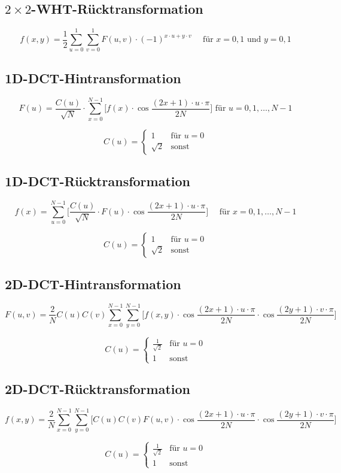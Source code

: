 \subsection*{$2 \times 2$-WHT-Rücktransformation}
\[
    f(x, y) = \frac{1}{2} \sum_{u=0}^{1} \sum_{v=0}^{1} F(u, v) \cdot {(-1)}^{x \cdot u + y \cdot v}
        \quad \mbox{ für } x = 0, 1 \mbox{ und } y = 0, 1
\]

\subsection*{1D-DCT-Hintransformation}
\[
F(u) = \frac{C(u)}{\sqrt{N}}
    \cdot \sum_{x=0}^{N-1} \bigg[ f(x)
    \cdot \cos{\frac{(2x+1) \cdot u \cdot \pi{}}{2N}}
    \bigg] \mbox{  für } u=0,1,\ldots,N-1
\]
    
\[
    C(u) = \begin{cases}
        1 & \text{für } u=0\\
        \sqrt{2} & \text{sonst}
    \end{cases}
\]

\subsection*{1D-DCT-Rücktransformation}
\[
    f(x) = \sum_{u=0}^{N-1} \bigg[ \frac{C(u)}{\sqrt{N}}
    \cdot F(u)
    \cdot \cos{\frac{(2x+1) \cdot u \cdot \pi{}}{2N}}
    \bigg] \quad \mbox{ für } x=0,1,\ldots,N-1
\]
    
\[
    C(u) = \begin{cases}
        1 & \text{für } u=0\\
        \sqrt{2} & \text{sonst}
    \end{cases}
\]

\subsection*{2D-DCT-Hintransformation}
\[
    F(u, v) = \frac{2}{N} C(u) C(v) \sum_{x=0}^{N-1} \sum_{y=0}^{N-1} \bigg[ f(x, y) \cdot 
    \cos \frac{(2x + 1) \cdot u \cdot \pi}{2 N} \cdot \cos \frac{(2y + 1) \cdot v \cdot \pi}{2 N} \bigg]
\]
    
\[
    C(u) = \begin{cases}
        \frac{1}{\sqrt{2}} & \text{für } u=0\\
        1 & \text{sonst}
    \end{cases}
\]

\subsection*{2D-DCT-Rücktransformation}
\[
    f(x, y) = \frac{2}{N} \sum_{x=0}^{N-1} \sum_{y=0}^{N-1} \bigg[ C(u) C(v) F(u, v) \cdot 
    \cos \frac{(2x + 1) \cdot u \cdot \pi}{2 N} \cdot \cos \frac{(2y + 1) \cdot v \cdot \pi}{2 N} \bigg]
\]
    
\[
    C(u) = \begin{cases}
        \frac{1}{\sqrt{2}} & \text{für } u=0\\
        1 & \text{sonst}
    \end{cases}
\]
